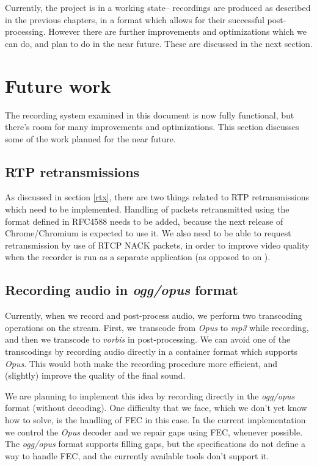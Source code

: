 \documentclass[twoside,openright,a4paper,12pt,english]{article}
\begin{document}
Currently, the project is in a working state-- recordings are produced as
described in the previous chapters, in a format which allows for their
successful post-processing. However there are further improvements and
optimizations which we can do, and plan to do in the near future. These are
discussed in the next section.


\section{Future work}
\label{future-work}
The recording system examined in this document is now fully functional,
but there's room for many improvements and optimizations. This section
discusses some of the work planned for the near future.

\subsection{RTP retransmissions}
As discussed in section \ref{rtx}, there are two things related to RTP retransmissions which need to be implemented.
Handling of packets retransmitted using the format defined in RFC4588 needs to
be added, because the next release of Chrome/Chromium is expected to use it.
We also need to be able to request retransmission by use of RTCP NACK packets,
in order to improve video quality when the recorder is run as a separate
application (as opposed to on \jvb).

\subsection{Recording audio in \emph{ogg/opus} format}
\label{ogg-opus}
Currently, when we record and post-process audio, we perform two transcoding
operations on the stream.
First, we transcode from \emph{Opus} to \emph{mp3} while recording, and then we transcode 
to \emph{vorbis} in post-processing. We can avoid one of the transcodings
by recording audio directly in a container format which supports \emph{Opus}.
This would both make the recording procedure more efficient, and (slightly)
improve the quality of the final sound.

We are planning to implement this idea by recording directly in the
\emph{ogg/opus} format (without decoding). One difficulty
that we face, which we don't yet know how to solve, is the handling of FEC in this
case. In the current implementation we control the \emph{Opus} decoder and we
repair gaps using FEC, whenever possible. The \emph{ogg/opus} format supports
filling gaps, but the specifications\cite{ogg,ogg-opus} do not define a way to
handle FEC, and the currently available tools don't support it.
\end{document}
